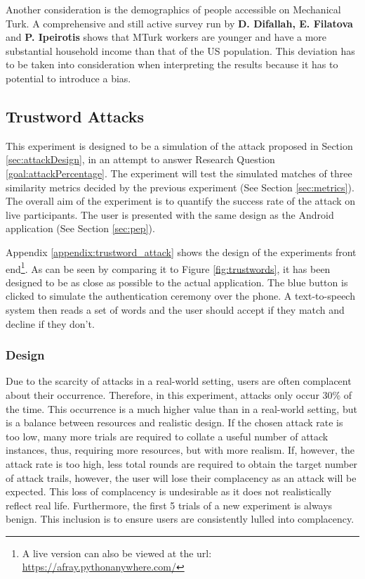 Another consideration is the demographics of people accessible on Mechanical Turk. A comprehensive and still active survey run by \textbf{D. Difallah, E. Filatova} and \textbf{P. Ipeirotis}\cite{difallah2018demographics} shows that MTurk workers are younger and have a more substantial household income than that of the US population. This deviation has to be taken into consideration when interpreting the results because it has to potential to introduce a bias.

\newpage

\subsection{Trustword Attacks}
\label{sec:exp2_design}

This experiment is designed to be a simulation of the attack proposed in Section \ref{sec:attackDesign}, in an attempt to answer Research Question \ref{goal:attackPercentage}. The experiment will test the simulated matches of three similarity metrics decided by the previous experiment (See Section \ref{sec:metrics}). The overall aim of the experiment is to quantify the success rate of the attack on live participants. The user is presented with the same design as the \pep Android application (See Section \ref{sec:pep}).

Appendix \ref{appendix:trustword_attack} shows the design of the experiments front end\footnote{A live version can also be viewed at the url: \url{https://afray.pythonanywhere.com/}}. As can be seen by comparing it to Figure \ref{fig:trustwords}, it has been designed to be as close as possible to the actual application. The blue button is clicked to simulate the authentication ceremony over the phone. A text-to-speech system then reads a set of words and the user should accept if they match and decline if they don't.

\subsubsection{Design}

Due to the scarcity of attacks in a real-world setting, users are often complacent about their occurrence. Therefore, in this experiment, attacks only occur 30\% of the time. This occurrence is a much higher value than in a real-world setting, but is a balance between resources and realistic design. If the chosen attack rate is too low, many more trials are required to collate a useful number of attack instances, thus, requiring more resources, but with more realism. If, however, the attack rate is too high, less total rounds are required to obtain the target number of attack trails, however, the user will lose their complacency as an attack will be expected. This loss of complacency is undesirable as it does not realistically reflect real life. Furthermore, the first 5 trials of a new experiment is always benign. This inclusion is to ensure users are consistently lulled into complacency.

